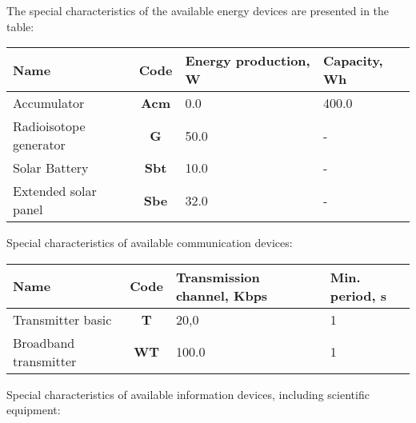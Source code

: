 \documentclass[12pt,a4paper]{article}
\begin{document}
The special characteristics of the available energy devices are presented in the table:

\begin{center}
\begin{tabular}{ |p{7cm}|c|p{3cm}|p{3cm}| }
  \hline
  \textbf{Name} & \textbf{Code} &
   \textbf{Energy production, W} &
   \textbf{Capacity, Wh} \\
  \hline
Accumulator & \textbf{Acm} & 0.0 & 400.0 \\
\hline
Radioisotope generator & \textbf{G} & 50.0 & - \\
\hline
Solar Battery & \textbf{Sbt} & 10.0 & - \\
\hline
Extended solar panel & \textbf{Sbe} & 32.0 & - \\
\hline
\end{tabular}
\end{center}

Special characteristics of available communication devices:

\begin{center}
\begin{tabular}{ |p{7cm}|c|p{3cm}|p{3cm}| }
   \hline
   \textbf{Name} & \textbf{Code} &
   \textbf{Transmission channel, Kbps} &
   \textbf{Min. period, s} \\
   \hline
Transmitter basic & \textbf{T} & 20,0 & 1 \\
\hline
Broadband transmitter & \textbf{WT} & 100.0 & 1 \\
\hline
\end{tabular}
\end{center}

Special characteristics of available information devices, including scientific equipment:
\end{document}
